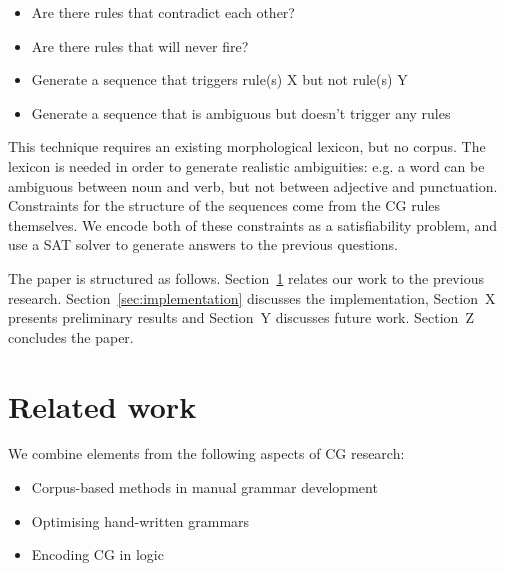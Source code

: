 \begin{itemize}
\item Are there rules that contradict each other?
\item Are there rules that will never fire?
\item Generate a sequence that triggers rule(s) X but not rule(s) Y
\item Generate a sequence that is ambiguous but doesn't trigger any rules
\end{itemize}

This technique requires an existing morphological lexicon, but no corpus. 
The lexicon is needed in order to generate realistic ambiguities: e.g. a word can be ambiguous between noun and verb, but not between adjective and punctuation. 
Constraints for the structure of the sequences come from the CG rules themselves.
We encode both of these constraints as a satisfiability problem, and use a SAT solver to generate answers to the previous questions.

The paper is structured as follows. Section~\ref{sec:prev} relates our work to the previous research. Section~\ref{sec:implementation} discusses the implementation, Section~X presents preliminary results and  Section~Y discusses future work. Section~Z concludes the paper.







\section{Related work}
\label{sec:prev}


We combine elements from the following aspects of CG research:

\begin{itemize}
\item Corpus-based methods in manual grammar development \cite{voutilainen2004}
\item Optimising hand-written grammars \cite{bick2013tuning}
\item Encoding CG in logic \cite{lager98,lager_nivre01,listenmaa_claessen2015}
\end{itemize}

